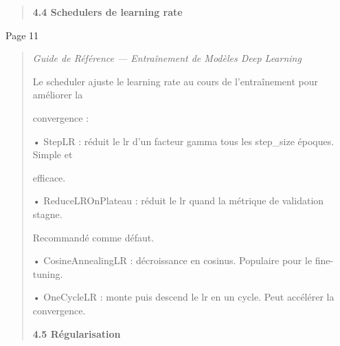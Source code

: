 \documentclass[
]{article}
\begin{document}
\begin{quote}
\textbf{4.4 Schedulers de learning rate}
\end{quote}

Page 11

\begin{quote}
\emph{Guide de Référence --- Entraînement de Modèles Deep Learning}

Le scheduler ajuste le learning rate au cours de l'entraînement pour
améliorer la

convergence :

• StepLR : réduit le lr d'un facteur gamma tous les step\_size époques.
Simple et

efficace.

• ReduceLROnPlateau : réduit le lr quand la métrique de validation
stagne.

Recommandé comme défaut.

• CosineAnnealingLR : décroissance en cosinus. Populaire pour le
fine-tuning.

• OneCycleLR : monte puis descend le lr en un cycle. Peut accélérer la
convergence.

\textbf{4.5 Régularisation}
\end{quote}
\end{document}
